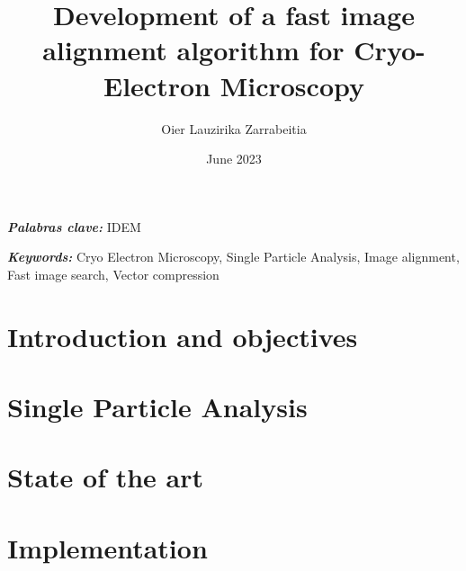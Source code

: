 \documentclass{etsit-report}
\title{Development of a fast image alignment algorithm for Cryo-Electron Microscopy}
\author{Oier Lauzirika Zarrabeitia}
\date{June 2023}
\begin{document}
\frontmatter

\cleardoublepage
\makefrontpage

\cleardoublepage
\makeinfopage

\cleardoublepage
\maketitle

\newpage\thispagestyle{empty}
\begin{otherlanguage}{spanish}
\begin{abstract}
    
\end{abstract}
\textit{\textbf{Palabras clave:}}
IDEM %

\newpage\thispagestyle{empty}
\end{otherlanguage}
\begin{abstract}
    
\end{abstract}
\textit{\textbf{Keywords: }}
Cryo Electron Microscopy, Single Particle Analysis, Image alignment, Fast image search, Vector compression

\cleardoublepage
\tableofcontents
\listoffigures
\listoftables

\printglossary[type=\acronymtype]

\mainmatter

\chapter{Introduction and objectives}
\label{chap:introduction}


\chapter{Single Particle Analysis}
\label{chap:spa}


\chapter{State of the art}
\label{chap:state_of_the_art}


\chapter{Implementation}
\label{chap:implementation}

\end{document}

